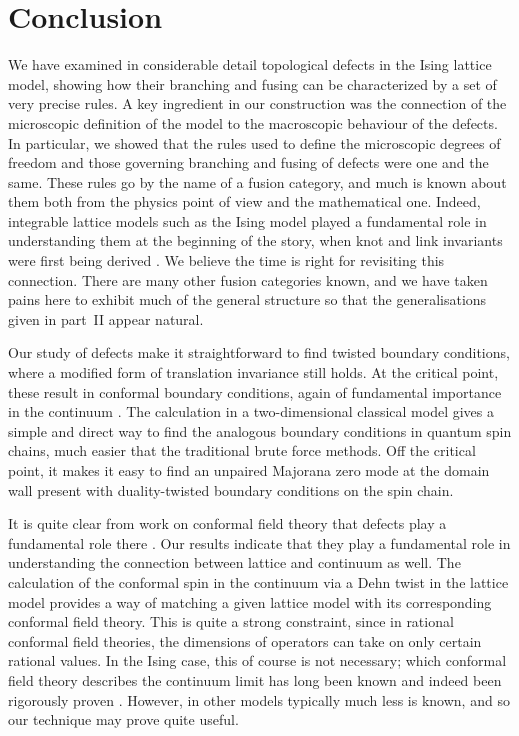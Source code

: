 \documentclass[11pt]{article}
\numberwithin{equation}{section}		%
\begin{document}
\section{Conclusion}

We have examined in considerable detail topological defects in the Ising lattice model, showing how their branching and fusing can be characterized by a set of very precise rules. A key ingredient in our construction was the connection of the microscopic definition of the model to the macroscopic behaviour of the defects. In particular, we showed that the rules used to define the microscopic degrees of freedom and those governing branching and fusing of defects were one and the same. These rules go by the name of a fusion category, and much is known about them both from the physics point of view and the mathematical one. Indeed, integrable lattice models such as the Ising model played a fundamental role in understanding them at the beginning of the story, when knot and link invariants were first being derived \cite{Wadati1989}. We believe the time is right for revisiting this connection. There are many other fusion categories known, and we have taken pains here to exhibit much of the general structure so that the generalisations given in part~II appear natural.


Our study of defects make it straightforward to find twisted boundary conditions, where a modified form of translation invariance still holds. At the critical point, these result in conformal boundary conditions, again of fundamental importance in the continuum \cite{Cardy1989}. The calculation in a two-dimensional classical model gives a simple and direct way to find the analogous boundary conditions in quantum spin chains, much easier that the traditional brute force methods. Off the critical point, it makes it easy to find an unpaired Majorana zero mode at the domain wall present with duality-twisted boundary conditions on the spin chain.  


It is quite clear from work on conformal field theory that defects play a fundamental role there \cite{Frohlich2004,Frohlich:2006}. Our results indicate that they play a fundamental role in understanding the connection 
between lattice and continuum as well. The calculation of the conformal spin in the continuum via a Dehn twist in the lattice model provides a way of matching a given lattice model with its corresponding conformal field theory. This is quite a strong constraint, since in rational conformal field theories, the dimensions of operators can take on only certain rational values. In the Ising case, this of course is not necessary; which conformal field theory describes the continuum limit has long been known \cite{BPZ:CFT:84} and indeed been rigorously proven \cite{Smirnov2012}. However, in other models typically much less is known, and so our technique may prove quite useful.
\end{document}
